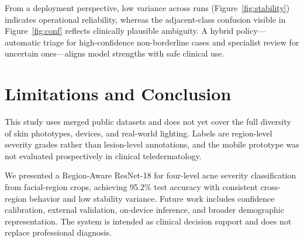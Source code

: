 \documentclass[10pt,conference]{IEEEtran}
\begin{document}
From a deployment perspective, low variance across runs (Figure~\ref{fig:stability}) indicates operational reliability, whereas the adjacent-class confusion visible in Figure~\ref{fig:conf} reflects clinically plausible ambiguity. A hybrid policy---automatic triage for high-confidence non-borderline cases and specialist review for uncertain ones---aligns model strengths with safe clinical use.

\section{Limitations and Conclusion}
This study uses merged public datasets and does not yet cover the full diversity of skin phototypes, devices, and real-world lighting. Labels are region-level severity grades rather than lesion-level annotations, and the mobile prototype was not evaluated prospectively in clinical teledermatology.

We presented a Region-Aware ResNet-18 for four-level acne severity classification from facial-region crops, achieving 95.2\% test accuracy with consistent cross-region behavior and low stability variance. Future work includes confidence calibration, external validation, on-device inference, and broader demographic representation. The system is intended as clinical decision support and does not replace professional diagnosis.
\end{document}
